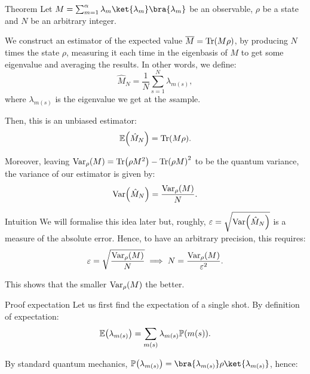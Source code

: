 \documentclass[a4paper]{article}
\begin{document}
\begin{parag}{Theorem}
    Let $M = \sum_{m=1}^{\alpha} \lambda_m \ket{\lambda_m}\bra{\lambda_m}$ be an observable, $\rho$ be a state and $N$ be an arbitrary integer. 

    We construct an estimator of the expected value $\bar{M} = \Tr\left(M \rho\right)$, by producing $N$ times the state $\rho$, measuring it each time in the eigenbasis of $M$ to get some eigenvalue and averaging the results. In other words, we define:
    \[\hat{M}_N = \frac{1}{N}\sum_{s=1}^{N} \lambda_{m\left(s\right)},\]
    where $\lambda_{m\left(s\right)}$ is the eigenvalue we get at the $s$\Th sample.
    
    Then, this is an unbiased estimator:
    \[\exval\left(\hat{M}_N\right) = \Tr\left(M \rho\right).\]
    
    Moreover, leaving $\Var_{\rho}\left(M\right) = \Tr\left(\rho M^2\right) - \Tr\left(\rho M\right)^2$ to be the quantum variance, the variance of our estimator is given by:
    \[\Var\left(\hat{M}_N\right) = \frac{\Var_{\rho}\left(M\right)}{N}.\]
    
    \begin{subparag}{Intuition}
        We will formalise this idea later but, roughly, $\epsilon = \sqrt{\Var\left(\hat{M}_N\right)}$ is a measure of the absolute error. Hence, to have an arbitrary precision, this requires: 
        \[\epsilon = \sqrt{\frac{\Var_{\rho}\left(M\right)}{N}} \implies N = \frac{\Var_{\rho}\left(M\right)}{\epsilon^2}.\]

        This shows that the smaller $\Var_{\rho}\left(M\right)$ the better.
    \end{subparag}

    \begin{subparag}{Proof expectation}
        Let us first find the expectation of a single shot. By definition of expectation:
        \[\exval\left(\lambda_{m\left(s\right)}\right) = \sum_{m\left(s\right)} \lambda_{m\left(s\right)}\prob\left(m\left(s\right)\right).\]

        By standard quantum mechanics, $\prob\left(\lambda_{m\left(s\right)}\right) = \bra{\lambda_{m\left(s\right)}} \rho \ket{\lambda_{m\left(s\right)}}$, hence: 


\end{subparag}
\end{parag}
\end{document}
